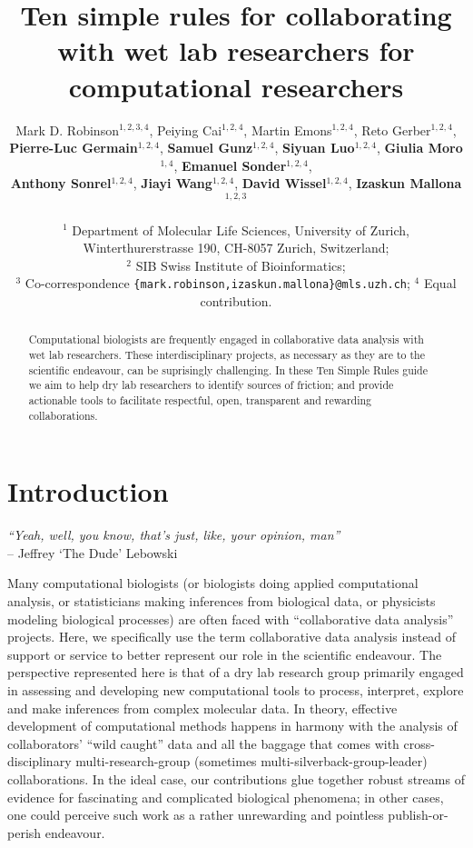 \documentclass{article}
\title{Ten simple rules for collaborating with wet lab researchers for computational researchers}
\author{
Mark D. Robinson$^{1,2,3,4}$, 
Peiying Cai$^{1,2,4}$,
Martin Emons$^{1,2,4}$,
Reto Gerber$^{1,2,4}$,\\
\textbf{Pierre-Luc Germain$^{1,2,4}$},
\textbf{Samuel Gunz$^{1,2,4}$}, 
\textbf{Siyuan Luo$^{1,2,4}$},
\textbf{Giulia Moro$^{1,4}$},
\textbf{Emanuel Sonder$^{1,2,4}$},\\
\textbf{Anthony Sonrel$^{1,2,4}$},
\textbf{Jiayi Wang$^{1,2,4}$},
\textbf{David Wissel$^{1,2,4}$},
\textbf{Izaskun Mallona$^{1,2,3}$}\\ 
\\
$^1$ Department of Molecular Life Sciences, University of Zurich, Winterthurerstrasse 190, CH-8057 Zurich, Switzerland;\\ $^2$ SIB Swiss Institute of Bioinformatics;\\ $^3$ Co-correspondence \texttt{\{mark.robinson,izaskun.mallona\}@mls.uzh.ch}; $^4$ Equal contribution.
}
\begin{document}
\maketitle

\vspace{-0.5cm}

\begin{abstract}
Computational biologists are frequently engaged in collaborative data analysis with wet lab researchers. These interdisciplinary projects, as necessary as they are to the scientific endeavour, can be suprisingly challenging. In these Ten Simple Rules guide we aim to help dry lab researchers to identify sources of friction; and provide actionable tools to facilitate respectful, open, transparent and rewarding collaborations.
\end{abstract}


\section*{Introduction} %

\begin{flushright}
\rightskip=1cm\textit{``Yeah, well, you know, that's just, like, your opinion, man''} \\
\vspace{.2em}
\rightskip=0cm -- Jeffrey `The Dude' Lebowski
\end{flushright}

Many computational biologists (or biologists doing applied computational analysis, or statisticians making inferences from biological data, or physicists modeling biological processes) are often faced with ``collaborative data analysis'' projects. Here, we specifically use the term collaborative data analysis instead of support or service to better represent our role in the scientific endeavour. The perspective represented here is that of a dry lab research group primarily engaged in assessing and developing new computational tools to process, interpret, explore and make inferences from complex molecular data. In theory, effective development of computational methods happens in harmony with the analysis of collaborators’ “wild caught” data and all the baggage that comes with cross-disciplinary multi-research-group (sometimes multi-silverback-group-leader) collaborations. In the ideal case, our contributions glue together robust streams of evidence for fascinating and complicated biological phenomena; in other cases, one could perceive such work as a rather unrewarding and pointless publish-or-perish endeavour.
\end{document}
